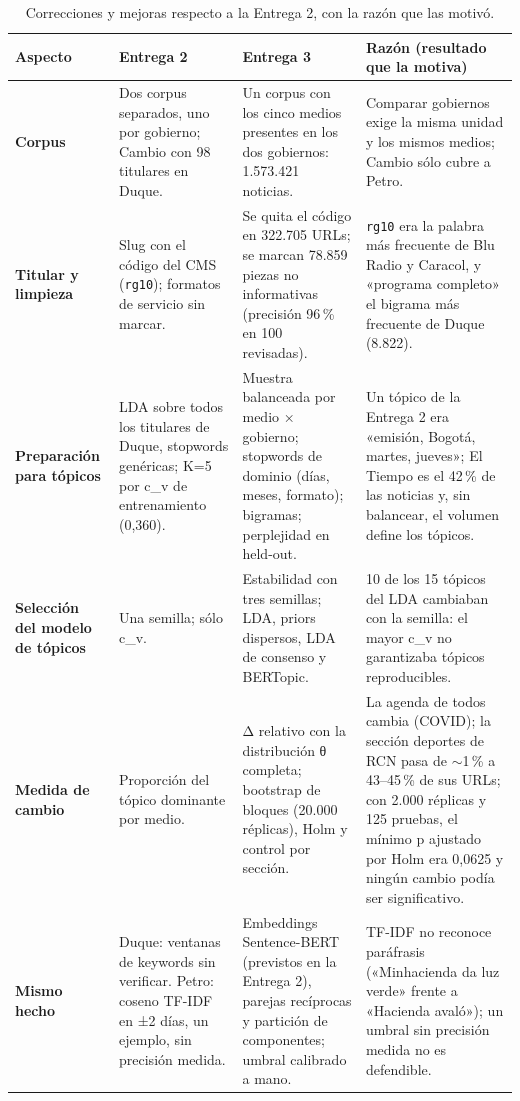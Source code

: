 \documentclass[10pt,twocolumn]{article}
\begin{document}
\begin{table}[t]
\centering\footnotesize
\caption{Correcciones y mejoras respecto a la Entrega 2, con la razón que las motivó.}
\label{tab:cambios}
\begin{tabularx}{\textwidth}{>{\bfseries}p{2.0cm} Y Y Y}
\toprule
\textnormal{\textbf{Aspecto}} & \textbf{Entrega 2} & \textbf{Entrega 3} & \textbf{Razón (resultado que la motiva)}\\
\midrule
Corpus & Dos corpus separados, uno por gobierno; Cambio con 98 titulares en Duque. & Un corpus con los cinco medios presentes en los dos gobiernos: 1.573.421 noticias. & Comparar gobiernos exige la misma unidad y los mismos medios; Cambio sólo cubre a Petro.\\
Titular y limpieza & Slug con el código del CMS (\texttt{rg10}); formatos de servicio sin marcar. & Se quita el código en 322.705 URLs; se marcan 78.859 piezas no informativas (precisión 96\,\% en 100 revisadas). & \texttt{rg10} era la palabra más frecuente de Blu Radio y Caracol, y «programa completo» el bigrama más frecuente de Duque (8.822).\\
Preparación para tópicos & LDA sobre todos los titulares de Duque, stopwords genéricas; K=5 por c\_v de entrenamiento (0,360). & Muestra balanceada por medio × gobierno; stopwords de dominio (días, meses, formato); bigramas; perplejidad en held-out. & Un tópico de la Entrega 2 era «emisión, Bogotá, martes, jueves»; El Tiempo es el 42\,\% de las noticias y, sin balancear, el volumen define los tópicos.\\
Selección del modelo de tópicos & Una semilla; sólo c\_v. & Estabilidad con tres semillas; LDA, priors dispersos, LDA de consenso y BERTopic. & 10 de los 15 tópicos del LDA cambiaban con la semilla: el mayor c\_v no garantizaba tópicos reproducibles.\\
Medida de cambio & Proporción del tópico dominante por medio. & Δ relativo con la distribución θ completa; bootstrap de bloques (20.000 réplicas), Holm y control por sección. & La agenda de todos cambia (COVID); la sección deportes de RCN pasa de $\sim$1\,\% a 43--45\,\% de sus URLs; con 2.000 réplicas y 125 pruebas, el mínimo p ajustado por Holm era 0,0625 y ningún cambio podía ser significativo.\\
Mismo hecho & Duque: ventanas de keywords sin verificar. Petro: coseno TF-IDF en ±2 días, un ejemplo, sin precisión medida. & Embeddings Sentence-BERT (previstos en la Entrega 2), parejas recíprocas y partición de componentes; umbral calibrado a mano. & TF-IDF no reconoce paráfrasis («Minhacienda da luz verde» frente a «Hacienda avaló»); un umbral sin precisión medida no es defendible.\\

\end{tabularx}
\end{table}
\end{document}
